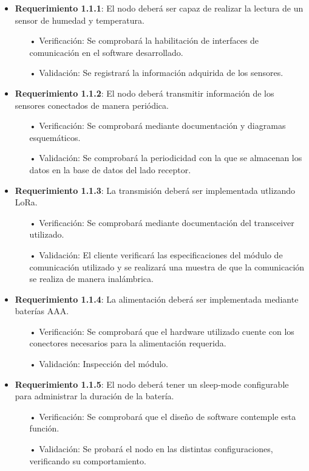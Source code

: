 \documentclass[11pt]{charter}
\begin{document}
\begin{itemize} 
\item \textbf{Requerimiento 1.1.1}: El nodo deberá ser capaz de realizar la lectura de un sensor de humedad y temperatura.
\begin{itemize}
\item[•] Verificación: Se comprobará la habilitación de interfaces de comunicación en el software desarrollado.
\item[•] Validación: Se registrará la información adquirida de los sensores.
\end{itemize}

\item \textbf{Requerimiento 1.1.2}: El nodo deberá transmitir información de los sensores conectados de manera periódica.
\begin{itemize}
\item[•] Verificación: Se comprobará mediante documentación y diagramas esquemáticos.
\item[•] Validación: Se comprobará la periodicidad con la que se almacenan los datos en la base de datos del lado receptor.
\end{itemize}

\item \textbf{Requerimiento 1.1.3}: La transmisión deberá ser implementada utlizando LoRa.
\begin{itemize}
\item[•] Verificación: Se comprobará mediante documentación del transceiver utilizado.
\item[•] Validación: El cliente verificará las especificaciones del módulo de comunicación utilizado y se realizará una muestra de que la comunicación se realiza de manera inalámbrica.
\end{itemize}

\item \textbf{Requerimiento 1.1.4}: La alimentación deberá ser implementada mediante baterías AAA.
\begin{itemize}
\item[•] Verificación: Se comprobará que el hardware utilizado cuente con los conectores necesarios para la alimentación requerida.
\item[•] Validación: Inspección del módulo.
\end{itemize}

\item \textbf{Requerimiento 1.1.5}: El nodo deberá tener un sleep-mode configurable para administrar la duración de la batería.
\begin{itemize}
\item[•] Verificación: Se comprobará que el diseño de software contemple esta función.
\item[•] Validación: Se probará el nodo en las distintas configuraciones, verificando su comportamiento.
\end{itemize}


\end{itemize}
\end{document}

